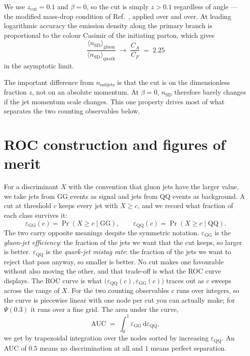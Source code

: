 \documentclass[reprint,amsmath,amssymb,aps,prd,floatfix]{revtex4-2}
\begin{document}
We use $z_{\mathrm{cut}} = 0.1$ and $\beta = 0$, so the cut is simply $z > 0.1$
regardless of angle --- the modified mass-drop condition of
Ref.~\cite{Dasgupta:2013ihk}, applied over and over. At leading logarithmic
accuracy the emission density along the primary branch is proportional to the
colour Casimir of the initiating parton, which gives
\begin{equation}
\frac{\langle n_{\mathrm{SD}}\rangle_{\mathrm{gluon}}}
     {\langle n_{\mathrm{SD}}\rangle_{\mathrm{quark}}}
\;\longrightarrow\; \frac{C_A}{C_F} \;=\; 2.25
\label{eq:casimir}
\end{equation}
in the asymptotic limit.

The important difference from $n_{\mathrm{subjets}}$ is that the cut is on the
dimensionless fraction $z$, not on an absolute momentum. At $\beta = 0$,
$n_{\mathrm{SD}}$ therefore barely changes if the jet momentum scale changes.
This one property drives most of what separates the two counting observables
below.

\section{ROC construction and figures of merit}\label{sec:roc}

For a discriminant $X$ with the convention that gluon jets have the larger
value, we take jets from GG events as signal and jets from QQ events as
background. A cut at threshold $c$ keeps every jet with $X \ge c$, and we
record what fraction of each class survives it:
\begin{equation}
\varepsilon_{\mathrm{GG}}(c) = \Pr(X \ge c \mid \mathrm{GG}), \qquad
\varepsilon_{\mathrm{QQ}}(c) = \Pr(X \ge c \mid \mathrm{QQ}).
\end{equation}
The two carry opposite meanings despite the symmetric notation.
$\varepsilon_{\mathrm{GG}}$ is the \emph{gluon-jet efficiency}: the fraction of
the jets we want that the cut keeps, so larger is better.
$\varepsilon_{\mathrm{QQ}}$ is the \emph{quark-jet mistag rate}: the fraction
of the jets we want to reject that pass anyway, so smaller is better. No cut
makes one favourable without also moving the other, and that trade-off is what
the ROC curve displays.
The ROC curve is what
$\bigl(\varepsilon_{\mathrm{QQ}}(c), \varepsilon_{\mathrm{GG}}(c)\bigr)$ traces
out as $c$ sweeps across the range of $X$. For the two counting observables $c$
runs over integers, so the curve is piecewise linear with one node per cut you
can actually make; for $\Psi(0.3)$ it runs over a fine grid. The area under the
curve,
\begin{equation}
\mathrm{AUC} \;=\; \int_0^1 \varepsilon_{\mathrm{GG}}\,
\mathrm{d}\varepsilon_{\mathrm{QQ}},
\end{equation}
we get by trapezoidal integration over the nodes sorted by increasing
$\varepsilon_{\mathrm{QQ}}$. An AUC of $0.5$ means no discrimination at all and
$1$ means perfect separation.
\end{document}
